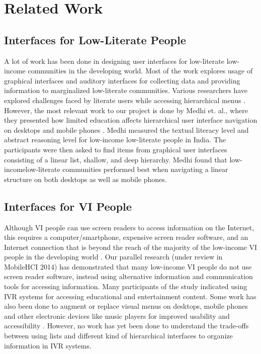 \documentclass{sigchi}
\providecommand{\DIFaddtex}[1]{{\protect\color{blue}\uwave{#1}}} %
\providecommand{\DIFaddbegin}{} %
\providecommand{\DIFaddend}{} %
\providecommand{\DIFadd}[1]{\texorpdfstring{\DIFaddtex{#1}}{#1}} %
\begin{document}
\section{Related Work}

\subsection{Interfaces for Low-Literate People}
A lot of work has been done in designing user interfaces for low-literate low-income communities in the developing world. Most of the work explores usage of graphical interfaces \cite{Grisedale1997,Medhi2011a,Medhi2008,Ghosh2003} and auditory interfaces \cite{Cuendet2013,Agarwal2010,Mudliar2013} for collecting data and providing information to marginalized low-literate communities. Various researchers have explored challenges faced by literate users while accessing hierarchical menus \cite{Allen1983,Chaudry2012}. However, the most relevant work to our project is done by Medhi et. al., where they presented how limited education affects hierarchical user interface navigation on desktops and mobile phones \cite{Medhi2013a,Medhi2013b}. Medhi measured the textual literacy level and abstract reasoning level for low-income low-literate people in India. The participants were then asked to find items from graphical user interfaces consisting of a linear list, shallow, and deep hierarchy. Medhi found that low-income\DIFaddbegin \DIFadd{, }\DIFaddend low-literate communities performed best when navigating a linear structure on both desktops as well as mobile phones.

\subsection{Interfaces for VI People}
Although VI people can use screen readers to access information on the Internet, this requires a computer/smartphone, expensive screen reader software, and an Internet connection that is beyond the reach of the majority of the low-income VI people in the developing world \cite{McCarthy2012}. Our parallel research (under review in MobileHCI 2014) has demonstrated that many low-income VI people do not use screen reader software, instead using alternative information and communication tools for accessing information. Many participants of the study indicated using IVR systems for accessing educational and entertainment content. Some work has also been done to augment or replace visual menus on desktops, mobile phones and other electronic devices like music players for improved usability and accessibility \cite{Yalla2008,Zhao2007,Jeon2012}. However, no work has yet been done to understand the trade-offs between using lists and different kind of hierarchical interfaces to organize information in IVR systems.
\end{document}

